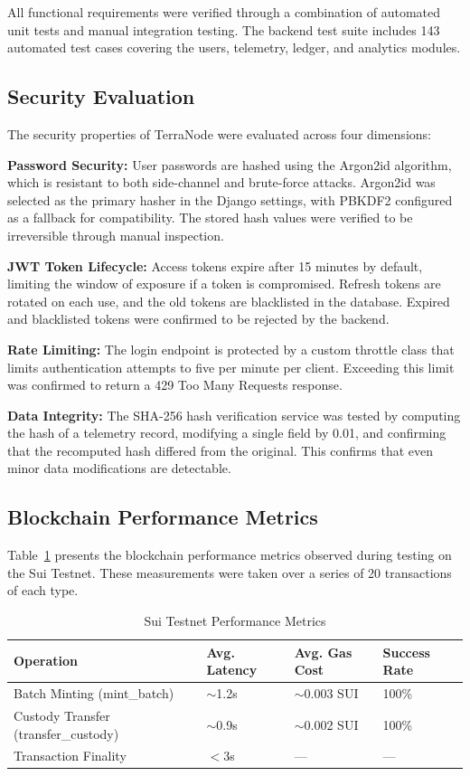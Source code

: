 All functional requirements were verified through a combination of automated unit tests and manual integration testing. The backend test suite includes 143 automated test cases covering the users, telemetry, ledger, and analytics modules.

\subsection{Security Evaluation}

The security properties of TerraNode were evaluated across four dimensions:

\textbf{Password Security:} User passwords are hashed using the Argon2id algorithm, which is resistant to both side-channel and brute-force attacks. Argon2id was selected as the primary hasher in the Django settings, with PBKDF2 configured as a fallback for compatibility. The stored hash values were verified to be irreversible through manual inspection.

\textbf{JWT Token Lifecycle:} Access tokens expire after 15 minutes by default, limiting the window of exposure if a token is compromised. Refresh tokens are rotated on each use, and the old tokens are blacklisted in the database. Expired and blacklisted tokens were confirmed to be rejected by the backend.

\textbf{Rate Limiting:} The login endpoint is protected by a custom throttle class that limits authentication attempts to five per minute per client. Exceeding this limit was confirmed to return a 429 Too Many Requests response.

\textbf{Data Integrity:} The SHA-256 hash verification service was tested by computing the hash of a telemetry record, modifying a single field by 0.01, and confirming that the recomputed hash differed from the original. This confirms that even minor data modifications are detectable.

\subsection{Blockchain Performance Metrics}

Table~\ref{tab:blockchain_perf} presents the blockchain performance metrics observed during testing on the Sui Testnet. These measurements were taken over a series of 20 transactions of each type.

\begin{table}[H]
\centering
\caption{Sui Testnet Performance Metrics}
\label{tab:blockchain_perf}
\begin{tabularx}{\textwidth}{|X|l|l|l|}
\hline
\textbf{Operation} & \textbf{Avg. Latency} & \textbf{Avg. Gas Cost} & \textbf{Success Rate} \\
\hline
Batch Minting (mint\_batch) & $\sim$1.2s & $\sim$0.003 SUI & 100\% \\
\hline
Custody Transfer (transfer\_custody) & $\sim$0.9s & $\sim$0.002 SUI & 100\% \\
\hline
Transaction Finality & $<$3s & --- & --- \\
\hline
\end{tabularx}
\end{table}

